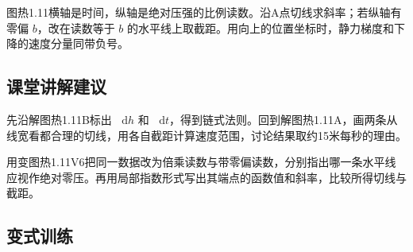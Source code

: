 \documentclass[UTF8,fontset=fandol,a4paper,11pt]{ctexart}
\newcommand{\dd}{\mathop{}\!\mathrm{d}}
\begin{document}
图热1.11横轴是时间，纵轴是绝对压强的比例读数。沿A点切线求斜率；若纵轴有零偏 $b$，改在读数等于 $b$ 的水平线上取截距。用向上的位置坐标时，静力梯度和下降的速度分量同带负号。



\subsection*{课堂讲解建议}

先沿解图热1.11B标出 $\dd h$ 和 $\dd t$，得到链式法则。回到解图热1.11A，画两条从线宽看都合理的切线，用各自截距计算速度范围，讨论结果取约15米每秒的理由。

用变图热1.11V6把同一数据改为倍乘读数与带零偏读数，分别指出哪一条水平线应视作绝对零压。再用局部指数形式写出其端点的函数值和斜率，比较所得切线与截距。




\subsection*{变式训练}
\end{document}
